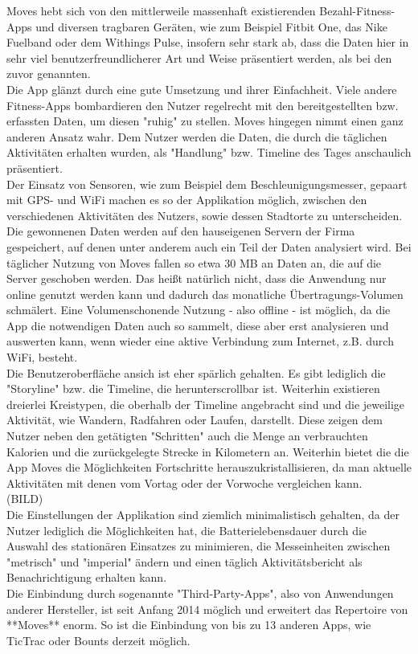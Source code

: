 Moves hebt sich von den mittlerweile massenhaft existierenden Bezahl-Fitness-Apps und diversen tragbaren Geräten, wie zum Beispiel Fitbit One, das Nike Fuelband oder dem Withings Pulse, insofern sehr stark ab, dass die Daten hier in sehr viel benutzerfreundlicherer Art und Weise präsentiert werden, als bei den zuvor genannten.
\\
Die App glänzt durch eine gute Umsetzung und ihrer Einfachheit. 
Viele andere Fitness-Apps bombardieren den Nutzer regelrecht mit den bereitgestellten bzw. erfassten Daten, um diesen "ruhig" zu stellen. 
Moves hingegen nimmt einen ganz anderen Ansatz wahr. 
Dem Nutzer werden die Daten, die durch die täglichen Aktivitäten erhalten wurden, als "Handlung" bzw. Timeline des Tages anschaulich präsentiert.
\\
Der Einsatz von Sensoren, wie zum Beispiel dem Beschleunigungsmesser, gepaart mit GPS- und WiFi machen es so der Applikation möglich, zwischen den verschiedenen Aktivitäten des Nutzers, sowie dessen Stadtorte zu unterscheiden. 
Die gewonnenen Daten werden auf den hauseigenen Servern der Firma gespeichert, auf denen unter anderem auch ein Teil der Daten analysiert wird. 
Bei täglicher Nutzung von Moves fallen so etwa 30 MB an Daten an, die auf die Server geschoben werden. 
Das heißt natürlich nicht, dass die Anwendung nur online genutzt werden kann und dadurch das monatliche Übertragungs-Volumen schmälert. 
Eine Volumenschonende Nutzung - also offline - ist möglich, da die App die notwendigen Daten auch so sammelt, diese aber erst analysieren und auswerten kann, wenn wieder eine aktive Verbindung zum Internet, z.B. durch WiFi, besteht.   
\\
Die Benutzeroberfläche ansich ist eher spärlich gehalten. 
Es gibt lediglich die "Storyline" bzw. die Timeline, die herunterscrollbar ist. 
Weiterhin existieren dreierlei Kreistypen, die oberhalb der Timeline angebracht sind und die jeweilige Aktivität, wie Wandern, Radfahren oder Laufen, darstellt. 
Diese zeigen dem Nutzer neben den getätigten "Schritten" auch die Menge an verbrauchten Kalorien und die zurückgelegte Strecke in Kilometern an. 
Weiterhin bietet die die App Moves die Möglichkeiten Fortschritte herauszukristallisieren, da man aktuelle Aktivitäten mit denen vom Vortag oder der Vorwoche vergleichen kann.   
\\
(BILD)
\\
Die Einstellungen der Applikation sind ziemlich minimalistisch gehalten, da der Nutzer lediglich die Möglichkeiten hat, die Batterielebensdauer durch die Auswahl des stationären Einsatzes zu minimieren, die Messeinheiten zwischen "metrisch" und "imperial" ändern und einen täglich Aktivitätsbericht als Benachrichtigung erhalten kann. 
\\
Die Einbindung durch sogenannte "Third-Party-Apps", also von Anwendungen anderer Hersteller, ist seit Anfang 2014 möglich und erweitert das Repertoire von **Moves** enorm. 
So ist die Einbindung von bis zu 13 anderen Apps, wie TicTrac oder Bounts derzeit möglich.  
\\

